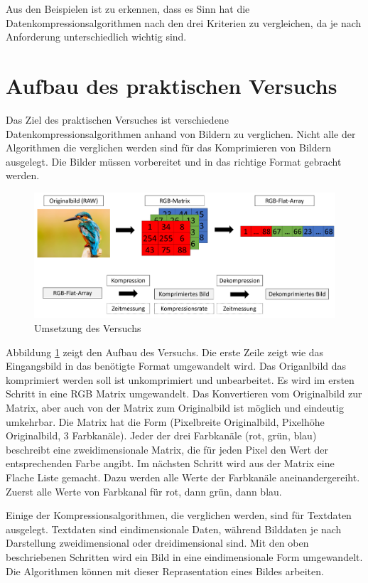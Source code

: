 \documentclass[conference]{IEEEtran}
\begin{document}
Aus den Beispielen ist zu erkennen, dass es Sinn hat die
Datenkompressionsalgorithmen nach den drei Kriterien zu vergleichen,
da je nach Anforderung unterschiedlich wichtig sind.


\section{Aufbau des praktischen Versuchs}

Das Ziel des praktischen Versuches ist verschiedene Datenkompressionsalgorithmen 
anhand von Bildern zu verglichen.
Nicht alle der Algorithmen die verglichen werden sind für das Komprimieren von 
Bildern ausgelegt.
Die Bilder müssen vorbereitet und in das richtige Format gebracht werden.

\begin{figure}[h]
    \centering
    \includegraphics[width=\columnwidth]{./images/Idea.png}
    \caption{Umsetzung des Versuchs}
    \label{fig:idea}
\end{figure}

Abbildung \ref{fig:idea} zeigt den Aufbau des Versuchs.
Die erste Zeile zeigt wie das Eingangsbild in das benötigte Format umgewandelt 
wird.
Das Origanlbild das komprimiert werden soll ist unkomprimiert und unbearbeitet.
Es wird im ersten Schritt in eine RGB Matrix umgewandelt.
Das Konvertieren vom Originalbild zur Matrix, aber auch von der Matrix 
zum Originalbild ist möglich und eindeutig umkehrbar.
Die Matrix hat die Form (Pixelbreite Originalbild, Pixelhöhe Originalbild, 
3 Farbkanäle).
Jeder der drei Farbkanäle (rot, grün, blau) beschreibt eine zweidimensionale Matrix, 
die für jeden Pixel den Wert der entsprechenden Farbe angibt.
Im nächsten Schritt wird aus der Matrix eine Flache Liste gemacht.
Dazu werden alle Werte der Farbkanäle aneinandergereiht.
Zuerst alle Werte von Farbkanal für rot, dann grün, dann blau.

Einige der Kompressionsalgorithmen, die verglichen werden, sind für Textdaten ausgelegt. 
Textdaten sind eindimensionale Daten, während Bilddaten je nach Darstellung 
zweidimensional oder dreidimensional sind.
Mit den oben beschriebenen Schritten wird ein Bild in eine eindimensionale 
Form umgewandelt. 
Die Algorithmen können mit dieser Reprasentation eines Bildes arbeiten.
\end{document}

